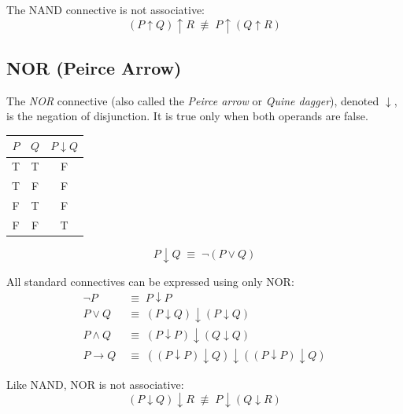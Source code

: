 \begin{remark}
The NAND connective is not associative:
\[
(P \uparrow Q) \uparrow R \;\not\equiv\; P \uparrow (Q \uparrow R)
\]
\end{remark}

\subsection{NOR (Peirce Arrow)}

\begin{definition}[NOR]
The \emph{NOR} connective (also called the \emph{Peirce arrow} or \emph{Quine
dagger}), denoted $\downarrow$, is the negation of disjunction. It is true only
when both operands are false.

\begin{center}
\renewcommand{\arraystretch}{1.2}
\begin{tabular}{|c|c||c|}
\hline
$P$ & $Q$ & $P \downarrow Q$ \\
\hline
T & T & F \\
T & F & F \\
F & T & F \\
F & F & T \\
\hline
\end{tabular}
\end{center}
\end{definition}

\begin{theorem}
\[
P \downarrow Q \;\equiv\; \neg(P \vee Q)
\]
\end{theorem}

\begin{theorem}
All standard connectives can be expressed using only NOR:
\begin{align*}
\neg P &\;\equiv\; P \downarrow P \\
P \vee Q &\;\equiv\; (P \downarrow Q) \downarrow (P \downarrow Q) \\
P \wedge Q &\;\equiv\; (P \downarrow P) \downarrow (Q \downarrow Q) \\
P \rightarrow Q &\;\equiv\; ((P \downarrow P) \downarrow Q) \downarrow ((P \downarrow P) \downarrow Q)
\end{align*}
\end{theorem}

\begin{remark}
Like NAND, NOR is not associative:
\[
(P \downarrow Q) \downarrow R \;\not\equiv\; P \downarrow (Q \downarrow R)
\]
\end{remark}

